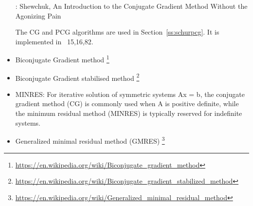 \begin{itemize}
\Literature: Shewchuk, An Introduction to the Conjugate 
Gradient Method Without the Agonizing Pain \cite{shew94}

The CG and PCG algorithms are used in Section~\ref{ss:schurpcg}.
It is implemented in \stone~15,16,82.








\item Biconjugate Gradient method
\footnote{\url{https://en.wikipedia.org/wiki/Biconjugate_gradient_method}}
\item Biconjugate Gradient stabilised method
\footnote{\url{https://en.wikipedia.org/wiki/Biconjugate_gradient_stabilized_method}}
\item MINRES: For iterative solution of symmetric systems Ax = b, the conjugate gradient method
(CG) is commonly used when A is positive definite, while the minimum residual method (MINRES)
is typically reserved for indefinite systems.


\item Generalized minimal residual method (GMRES)
\footnote{\url{https://en.wikipedia.org/wiki/Generalized_minimal_residual_method}}
\end{itemize}





